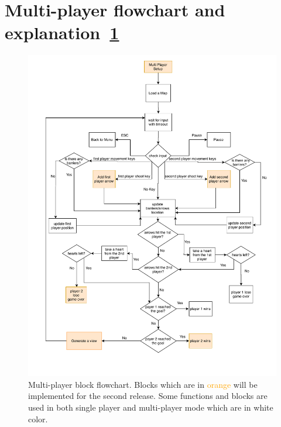 \section{Multi-player flowchart and explanation~\ref{fig:multiplayer}}

\begin{figure}
    \centering 
    \includegraphics[width=0.9\columnwidth]{multiplayer.pdf}
    \caption{Multi-player block flowchart. Blocks which are in \textcolor{orange}{orange} will be implemented for the second release. Some functions and blocks are used in both single player and multi-player mode which are in white color.}
    \label{fig:multiplayer}
\end{figure}

